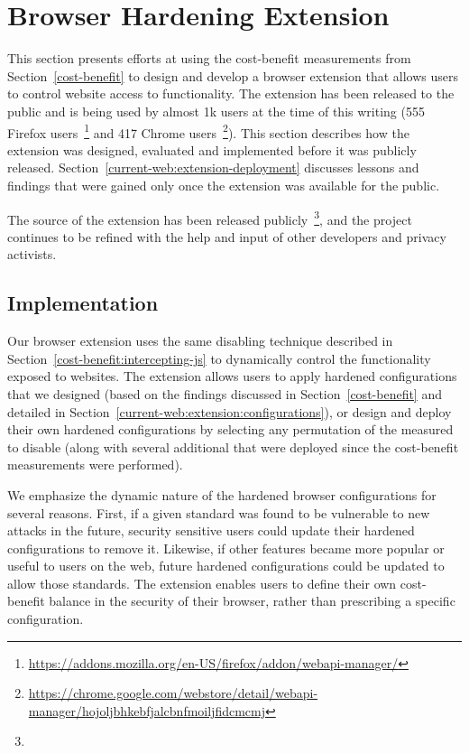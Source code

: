 \section{Browser Hardening Extension}
\label{current-web:extension}

This section presents efforts at using the cost-benefit measurements from
Section~\ref{cost-benefit} to design and develop a browser extension that
allows users to control website access to \WAPI functionality.  The extension
has been released to the public and is being used by almost 1k users at the
time of this writing (555 Firefox
users~\footnote{\url{https://addons.mozilla.org/en-US/firefox/addon/webapi-manager/}}
and 417 Chrome
users~\footnote{\url{https://chrome.google.com/webstore/detail/webapi-manager/hojoljbhkebfjalcbnfmoiljfidcmcmj}}).
This section describes how the extension was designed, evaluated and
implemented before it was publicly released.
Section~\ref{current-web:extension-deployment} discusses lessons and findings
that were gained only once the extension was available for the public.

The source of the extension has been released publicly~\footnote{\ExtensionSourceUrl},
and the project continues to be refined with the help and input of other
developers and privacy activists.


\subsection{Implementation}
Our browser extension uses the same \WAS disabling technique described in
Section~\ref{cost-benefit:intercepting-js} to dynamically control the \WAPI
functionality exposed to websites.  The extension allows users to
apply hardened configurations that we designed (based on the findings
discussed in Section~\ref{cost-benefit} and detailed in
Section~\ref{current-web:extension:configurations}), or design and deploy
their own hardened configurations by selecting any permutation of the
measured \WASs to disable (along with several additional \WASs that were deployed
since the cost-benefit measurements were performed).

We emphasize the dynamic nature of the hardened browser configurations for
several reasons.  First, if a given standard was found to be vulnerable to new
attacks in the future, security sensitive users could update their hardened
configurations to remove it.  Likewise, if other features became more popular
or useful to users on the web, future hardened configurations could be updated
to allow those standards.  The extension enables users to define their own
cost-benefit balance in the security of their browser, rather than prescribing
a specific configuration.

